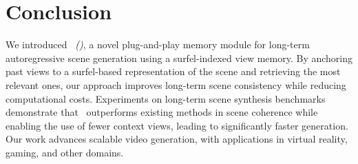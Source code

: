 \section{Conclusion}%
\label{sec:conclusion}

We introduced \textit{\mnamel~(\mname)}, a novel plug-and-play memory module for long-term autoregressive scene generation using a surfel-indexed view memory.
By anchoring past views to a surfel-based representation of the scene and retrieving the most relevant ones, our approach improves long-term scene consistency while reducing computational costs.
Experiments on long-term scene synthesis benchmarks demonstrate that \mname~outperforms existing methods in scene coherence while enabling the use of fewer context views, leading to significantly faster generation.
Our work advances scalable video generation, with applications in virtual reality, gaming, and other domains.
